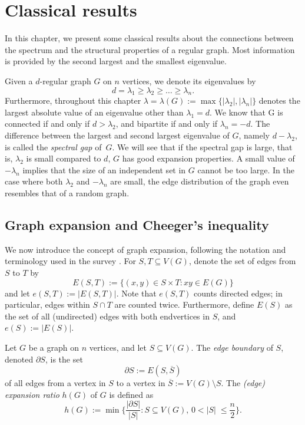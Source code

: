 \chapter{Classical results}
In this chapter, we present some classical results about the connections between the spectrum and the structural properties of a regular graph.
Most information is provided by the second largest and the smallest eigenvalue.

Given a $d$-regular graph $G$ on $n$ vertices, we denote its eigenvalues by 
\begin{equation*}
    d = \lambda_1 \ge \lambda_2 \ge \dots \ge \lambda_n.
\end{equation*}
Furthermore, throughout this chapter $\lambda = \lambda(G) := \max \{ |\lambda_2|, |\lambda_n | \}$ denotes the largest absolute value of an eigenvalue other than $\lambda_1 = d$.
We know that G is connected if and only if $d > \lambda_2$, and bipartite if and only if $\lambda_n = -d$. 
The difference between the largest and second largest eigenvalue of $G$, namely $d - \lambda_2$, is called the \textit{spectral gap} \mbox{of $G$}.
We will see that if the spectral gap is large, that is, $\lambda_2$ is small compared to $d$, $G$ has good expansion properties. 
A small value of $-\lambda_n$ implies that the size of an independent set in $G$ cannot be too large.
In the case where both $\lambda_2$ and $-\lambda_n$ are small, the edge distribution of the graph even resembles that of a random graph.  

\section{Graph expansion and Cheeger's inequality}
    \label{section:cheeger}
We now introduce the concept of graph expansion, following the notation and terminology used in the survey \cite{expandergraphs}. 
For $S, T \subseteq V(G)$, denote the set of edges from $S$ to $T$ by
\begin{equation*}
    E(S, T) := \{ (x, y) \in S \times T : xy \in E(G) \}
\end{equation*}
and let $e(S, T) := |E(S, T)|$. 
Note that $e(S, T)$ counts directed edges; in particular, edges within $S \cap T$ are counted twice.
Furthermore, define $E(S)$ as the set of all (undirected) edges with both endvertices in $S$, and $e(S):= |E(S)|$.

\begin{definition}
    Let $G$ be a graph on $n$ vertices, and let $S \subseteq V(G)$.
    The \textit{edge boundary} of $S$, denoted $\partial S$, is the set
    \begin{equation*}
        \partial S := E(S, \overline{S})
    \end{equation*}
    of all edges from a vertex in $S$ to a vertex in $\overline{S} := V(G) \setminus S$.
    The \textit{(edge) expansion ratio} $h(G)$ of $G$ is defined as 
    \begin{equation*}
        h(G) := \min \bigg \{ \frac{|\partial S|}{|S|} : S \subseteq V(G),\, 0 < |S|\; \le \frac{n}{2} \bigg \}.
    \end{equation*}
\end{definition}

